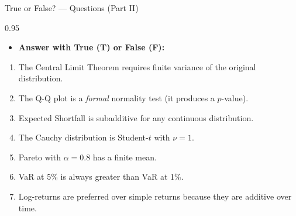 \documentclass[9pt, aspectratio=169, t]{beamer}
\begin{document}
\begin{frame}{True or False? --- Questions (Part II)}
\begin{cminipage}{0.95\textwidth}
    \begin{itemize}\setlength{\itemsep}{0pt}
        \item \textbf{Answer with True (T) or False (F):}
    \end{itemize}
    \vspace{0.3cm}
    \begin{enumerate}\setlength{\itemsep}{0pt}
        \setcounter{enumi}{7}
        \item The Central Limit Theorem requires finite variance of the original distribution.
        \item The Q-Q plot is a \textit{formal} normality test (it produces a $p$-value).
        \item Expected Shortfall is subadditive for any continuous distribution.
        \item The Cauchy distribution is Student-$t$ with $\nu = 1$.
        \item Pareto with $\alpha = 0.8$ has a finite mean.
        \item VaR at 5\% is always greater than VaR at 1\%.
        \item Log-returns are preferred over simple returns because they are additive over time.
    \end{enumerate}
\end{cminipage}
\end{frame}
\end{document}
